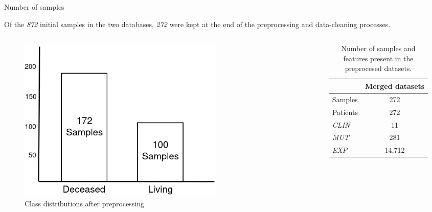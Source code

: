 \begin{frame}{Number of samples}

Of the \emph{872} initial samples in the two databases, \emph{272} were kept at the end of the preprocessing and data-cleaning processes. 

\begin{columns}

    \begin{column}{0.4\textwidth}
    \begin{center}
        \begin{figure}
            \centering
            \includegraphics[width=0.7\textwidth]{beamerthemesrc/figs/class_distribution.png}
            \caption{Class distributions after preprocessing}
            \label{fig:classdist}
        \end{figure}
    \end{center}
    \end{column}
    
    \begin{column}{0.4\textwidth}

    \begin{table}[!htb]
    \centering
    \begin{tabular}{c|c|}
    
    \cline{2-2}
    &  \textbf{Merged datasets} \\ \hline

    \multicolumn{1}{|l|}{Samples} & 272 \\ \hline
    \multicolumn{1}{|l|}{Patients}  & 272 \\ \hline
    \multicolumn{1}{|l|}{\emph{CLIN}} & 11 \\ \hline
    \multicolumn{1}{|l|}{\emph{MUT}} & 281 \\ \hline
   \multicolumn{1}{|l|}{\emph{EXP}} & 14,712 \\ \hline
    \end{tabular}
    \caption{Number of samples and features present in the preprocesed datasets.}
\end{table}


    
    \end{column}
        
    
\end{columns}

\end{frame}



